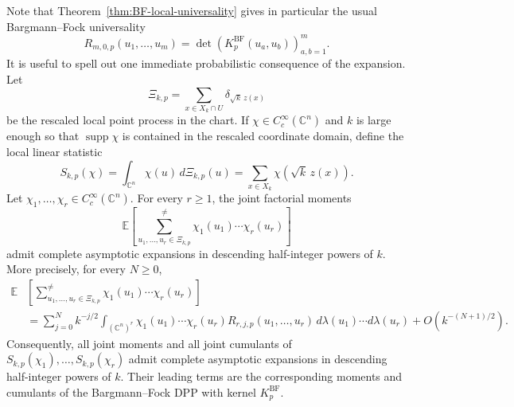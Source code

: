 \documentclass[12pt,a4paper,reqno]{article}
\theoremstyle{thmstyleone}
\theoremstyle{thmstylethree}
\theoremstyle{thmstyletwo}
\numberwithin{equation}{subsection}
\def\geq{\geqslant}
\begin{document}
Note that Theorem~\ref{thm:BF-local-universality} gives in particular the usual Bargmann--Fock universality
\[
    R_{m,0,p}(u_1,\ldots,u_m)
    =
    \det\left(K^{\mathrm{BF}}_p(u_a,u_b)\right)_{a,b=1}^m.
\]
It is useful to spell out one immediate probabilistic consequence of the expansion. Let
\[
    \Xi_{k,p}
    =
    \sum_{x\in X_k\cap U}\delta_{\sqrt k\,z(x)}
\]
be the rescaled local point process in the chart. If $\chi\in C_c^\infty(\mathbb C^n)$ and $k$ is large enough so that $\operatorname{supp}\chi$ is contained in the rescaled coordinate domain, define the local linear statistic
\[
    S_{k,p}(\chi)
    =
    \int_{\mathbb C^n}\chi(u)\,d\Xi_{k,p}(u)
    =
    \sum_{x\in X_k}\chi(\sqrt k\,z(x)).
\]
Let $\chi_1,\ldots,\chi_r\in C_c^\infty(\mathbb C^n)$. For every $r\geq 1$, the joint factorial moments
\[
    \mathbb E\left[
        \sum_{u_1,\ldots,u_r\in \Xi_{k,p}}^{\neq}
        \chi_1(u_1)\cdots \chi_r(u_r)
    \right]
\]
admit complete asymptotic expansions in descending half-integer powers of $k$. More precisely, for every $N\geq 0$,
\begin{align*}
\mathbb E & \left[\sum_{u_1,\ldots,u_r\in \Xi_{k,p}}^{\neq} \chi_1(u_1)\cdots \chi_r(u_r)\right]\\
& =\sum_{j=0}^N k^{-j/2}\int_{(\mathbb C^n)^r}\chi_1(u_1)\cdots\chi_r(u_r)R_{r,j,p}(u_1,\ldots,u_r)\,d\lambda(u_1)\cdots d\lambda(u_r)+O(k^{-(N+1)/2}).
\end{align*}
Consequently, all joint moments and all joint cumulants of $S_{k,p}(\chi_1),\ldots,S_{k,p}(\chi_r)$ admit complete asymptotic expansions in descending half-integer powers of $k$. Their leading terms are the corresponding moments and cumulants of the Bargmann--Fock DPP with kernel $K_p^{\mathrm{BF}}$.
\end{document}

